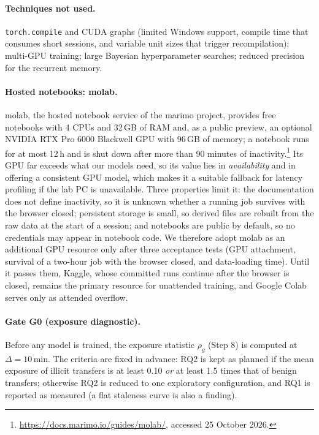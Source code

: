 \documentclass[11pt,a4paper]{article}
\begin{document}
\paragraph{Techniques not used.} \texttt{torch.compile} and CUDA graphs (limited Windows support, compile time that consumes short sessions, and variable unit sizes that trigger recompilation); multi-GPU training; large Bayesian hyperparameter searches; reduced precision for the recurrent memory.

\paragraph{Hosted notebooks: molab.} molab, the hosted notebook service of the marimo project, provides free notebooks with 4 CPUs and 32\,GB of RAM and, as a public preview, an optional NVIDIA RTX Pro 6000 Blackwell GPU with 96\,GB of memory; a notebook runs for at most 12\,h and is shut down after more than 90 minutes of inactivity.\footnote{\url{https://docs.marimo.io/guides/molab/}, accessed 25 October 2026.} Its GPU far exceeds what our models need, so its value lies in \emph{availability} and in offering a consistent GPU model, which makes it a suitable fallback for latency profiling if the lab PC is unavailable. Three properties limit it: the documentation does not define inactivity, so it is unknown whether a running job survives with the browser closed; persistent storage is small, so derived files are rebuilt from the raw data at the start of a session; and notebooks are public by default, so no credentials may appear in notebook code. We therefore adopt molab as an additional GPU resource only after three acceptance tests (GPU attachment, survival of a two-hour job with the browser closed, and data-loading time). Until it passes them, Kaggle, whose committed runs continue after the browser is closed, remains the primary resource for unattended training, and Google Colab serves only as attended overflow.

\paragraph{Gate G0 (exposure diagnostic).} Before any model is trained, the exposure statistic $\rho_g$ (Step 8) is computed at $\Delta=10$\,min. The criteria are fixed in advance: RQ2 is kept as planned if the mean exposure of illicit transfers is at least 0.10 \emph{or} at least 1.5 times that of benign transfers; otherwise RQ2 is reduced to one exploratory configuration, and RQ1 is reported as measured (a flat staleness curve is also a finding).
\end{document}
